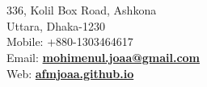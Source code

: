 
\hspace*{0pt}\hfill    \\
\hspace*{0pt}\hfill    \\
336, Kolil Box Road, Ashkona \\
Uttara, Dhaka-1230 \\
Mobile: +880-1303464617 \\
Email: \textbf{\href{mailto:mohimenul.joaa@gmail.com}{mohimenul.joaa@gmail.com}} \\
Web: \textbf{\href{https://afmjoaa.github.io/}{afmjoaa.github.io \raisebox{0pt}{\color{secondaryLightText}\fontsize{7}{7}\faLink}}}
\vspace{0.2cm}
